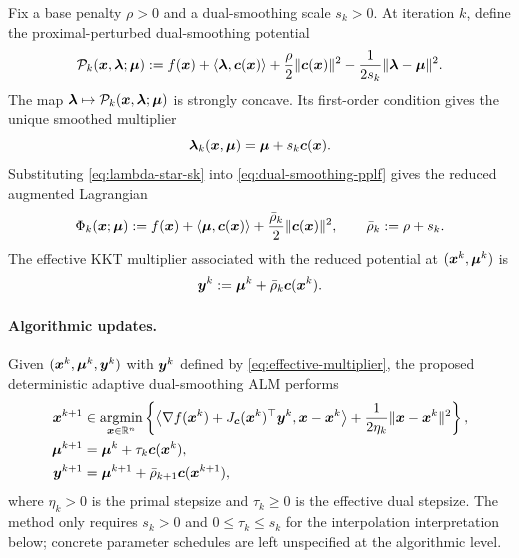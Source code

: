 \documentclass[10pt]{article}
\begin{document}
Fix a base penalty $\rho>0$ and a dual-smoothing scale $s_k>0$.  At
iteration $k$, define the proximal-perturbed dual-smoothing potential
\begin{equation}\label{eq:dual-smoothing-pplf}
    \mathcal P_k(\bm{x},\bm{\lambda};\bm{\mu})
    :=
    f(\bm{x})
    +\langle \bm{\lambda},\bm{c}(\bm{x})\rangle
    +\frac{\rho}{2}\|\bm{c}(\bm{x})\|^2
    -\frac{1}{2s_k}\|\bm{\lambda}-\bm{\mu}\|^2 .
\end{equation}
The map $\bm{\lambda}\mapsto\mathcal P_k(\bm{x},\bm{\lambda};\bm{\mu})$ is strongly concave.
Its first-order condition gives the unique smoothed multiplier
\begin{equation}\label{eq:lambda-star-sk}
    \bm{\lambda}_k(\bm{x},\bm{\mu})
    =
    \bm{\mu}+s_k\bm{c}(\bm{x}).
\end{equation}
Substituting \eqref{eq:lambda-star-sk} into
\eqref{eq:dual-smoothing-pplf} gives the reduced augmented Lagrangian
\begin{equation*}
    \Phi_k(\bm{x};\bm{\mu})
    :=
    f(\bm{x})
    +
    \langle \bm{\mu},\bm{c}(\bm{x})\rangle
    +
    \frac{\bar\rho_k}{2}\|\bm{c}(\bm{x})\|^2,
    \qquad
    \bar\rho_k:=\rho+s_k.
\end{equation*}
The effective KKT multiplier associated with the reduced potential at
$(\bm{x}^k,\bm{\mu}^k)$ is
\begin{equation}\label{eq:effective-multiplier}
    \bm{y}^k
    :=
    \bm{\mu}^k+\bar\rho_k\bm{c}(\bm{x}^k).
\end{equation}

\paragraph{Algorithmic updates.}
Given $(\bm{x}^k,\bm{\mu}^k,\bm{y}^k)$ with $\bm{y}^k$ defined by
\eqref{eq:effective-multiplier}, the proposed deterministic adaptive
dual-smoothing ALM performs
\begin{align}
    \bm{x}^{k+1}
    &\in
    \operatorname*{\mathrm{argmin}}_{\bm{x}\in\mathbb{R}^n}
    \left\{
    \left\langle
    \nabla f(\bm{x}^k)
    +J_{\bm{c}}(\bm{x}^k)^\top\bm{y}^k,
    \bm{x}-\bm{x}^k
    \right\rangle
    +\frac{1}{2\eta_k}\|\bm{x}-\bm{x}^k\|^2
    \right\},
    \label{eq:x-update-det}\\
    \bm{\mu}^{k+1}
    &=
    \bm{\mu}^k+\tau_k\bm{c}(\bm{x}^k),
    \label{eq:mu-update-det}\\
    \bm{y}^{k+1}
    &=
    \bm{\mu}^{k+1}+\bar\rho_{k+1}\bm{c}(\bm{x}^{k+1}),
    \label{eq:y-update-det}
\end{align}
where $\eta_k>0$ is the primal stepsize and $\tau_k\ge0$ is the effective
dual stepsize.  The method only requires $s_k>0$ and
$0\le\tau_k\le s_k$ for the interpolation interpretation below; concrete
parameter schedules are left unspecified at the algorithmic level.
\end{document}
